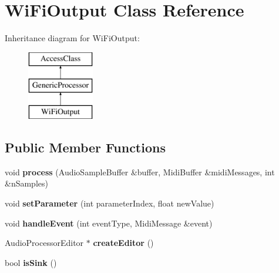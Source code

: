 \hypertarget{classWiFiOutput}{\section{Wi\-Fi\-Output Class Reference}
\label{classWiFiOutput}
}
Inheritance diagram for Wi\-Fi\-Output\-:\begin{figure}[H]
\begin{center}
\leavevmode
\includegraphics[height=3.000000cm]{classWiFiOutput}
\end{center}
\end{figure}
\subsection*{Public Member Functions}
\begin{DoxyCompactItemize}
\item 
\hypertarget{classWiFiOutput_abc54bbb230ebde577c57b2c2738ec8f2}{void {\bfseries process} (Audio\-Sample\-Buffer \&buffer, Midi\-Buffer \&midi\-Messages, int \&n\-Samples)}\label{classWiFiOutput_abc54bbb230ebde577c57b2c2738ec8f2}

\item 
\hypertarget{classWiFiOutput_a55966db7f391dbe259b81af504d9f308}{void {\bfseries set\-Parameter} (int parameter\-Index, float new\-Value)}\label{classWiFiOutput_a55966db7f391dbe259b81af504d9f308}

\item 
\hypertarget{classWiFiOutput_a0e93a3cf98dc10d3f459af9077ec8f2f}{void {\bfseries handle\-Event} (int event\-Type, Midi\-Message \&event)}\label{classWiFiOutput_a0e93a3cf98dc10d3f459af9077ec8f2f}

\item 
\hypertarget{classWiFiOutput_a9564f12289948f0db13ffbc062f6b40d}{Audio\-Processor\-Editor $\ast$ {\bfseries create\-Editor} ()}\label{classWiFiOutput_a9564f12289948f0db13ffbc062f6b40d}

\item 
\hypertarget{classWiFiOutput_a7319ef7d2fa9db8db82e9983066a2ebd}{bool {\bfseries is\-Sink} ()}\label{classWiFiOutput_a7319ef7d2fa9db8db82e9983066a2ebd}

\end{DoxyCompactItemize}
